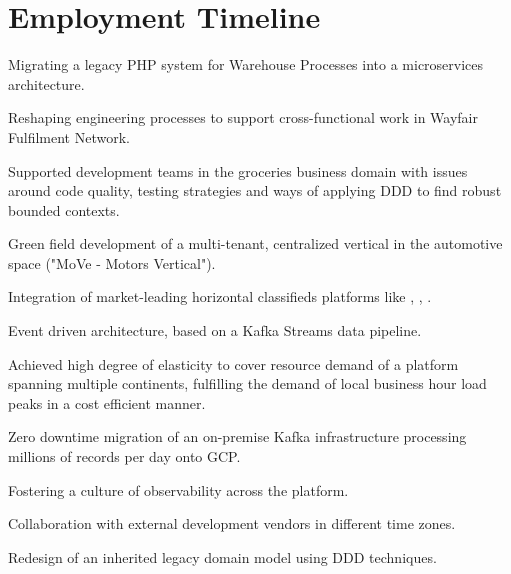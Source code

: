 \documentclass[]{resume}
\begin{document}
\hfill
\begin{minipage}[t]{0.64\textwidth} 


\section{Employment Timeline}

\vspace{\topsep} %
\begin{tightemize}
\item Migrating a legacy PHP system for Warehouse Processes into a microservices architecture.
\item Reshaping engineering processes to support cross-functional work in Wayfair Fulfilment Network.
\end{tightemize}
\sectionsep

\vspace{\topsep} %
Supported development teams in the groceries business domain with issues around code quality, testing strategies and ways of applying DDD to find robust bounded contexts.
\sectionsep

\vspace{\topsep} %
\begin{tightemize}
\item Green field development of a multi-tenant, centralized vertical in the automotive space ("MoVe - Motors Vertical").
\item Integration of market-leading horizontal classifieds platforms like \href{https://www.kijiji.ca}{}, \href{https://www.gumtree.com.au}{}, \href{https://www.gumtree.co.uk}{}.
\item Event driven architecture, based on a Kafka Streams data pipeline.
\item Achieved high degree of elasticity to cover resource demand of a platform spanning multiple continents, fulfilling the demand of local business hour load peaks in a cost efficient manner.
\item Zero downtime migration of an on-premise Kafka infrastructure processing millions of records per day onto GCP.
\item Fostering a culture of observability across the platform.
\item Collaboration with external development vendors in different time zones.
\item Redesign of an inherited legacy domain model using DDD techniques.
\end{tightemize}
\sectionsep


\end{minipage}
\end{document}
